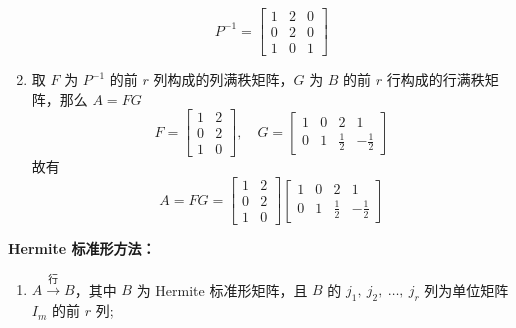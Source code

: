 \begin{solution}
\begin{enumerate}
                        \begin{equation*}
                            P^{-1} = \begin{bmatrix}
                                1 & 2 & 0 \\ 0 & 2 & 0 \\ 1 & 0 & 1
                            \end{bmatrix}
                        \end{equation*}
                    \item 取 $F$ 为 $P^{-1}$ 的前 $r$ 列构成的列满秩矩阵，$G$ 为 $B$ 的前 $r$ 行构成的行满秩矩阵，那么 $A = FG$
                        \begin{equation*}
                            F = \begin{bmatrix}
                                1 & 2 \\ 0 & 2 \\ 1 & 0
                            \end{bmatrix}, \quad G = \begin{bmatrix}
                                1 & 0 & 2 & 1 \\ 0 & 1 & \frac{1}{2} & -\frac{1}{2}
                            \end{bmatrix}
                        \end{equation*}
                        故有
                        \begin{equation*}
                            A = FG = \begin{bmatrix}
                                1 & 2 \\ 0 & 2 \\ 1 & 0
                            \end{bmatrix}\begin{bmatrix}
                                1 & 0 & 2 & 1 \\ 0 & 1 & \frac{1}{2} & -\frac{1}{2}
                            \end{bmatrix}
                        \end{equation*}
                \end{enumerate}
                \textbf{Hermite 标准形方法：}
                \begin{enumerate}
                    \item $A \stackrel{\text{行}}{\longrightarrow} B$，其中 $B$ 为 Hermite 标准形矩阵，且 $B$ 的 $j_1, \ j_2, \ \dots, \ j_r$ 列为单位矩阵 $I_m$ 的前 $r$ 列;
                        \begin{equation*}

\end{equation*}
\end{enumerate}
\end{solution}
